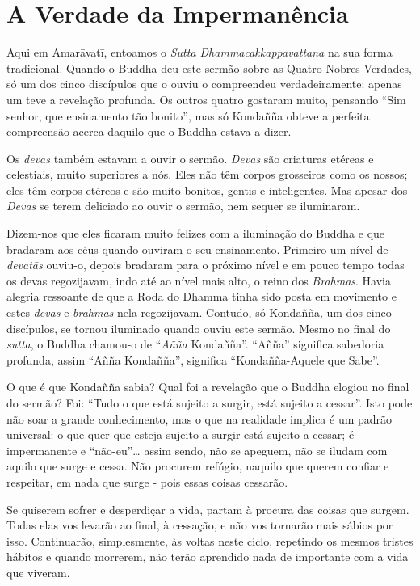 \section{A Verdade da Impermanência}

Aqui em Amarāvatī, entoamos o \emph{Sutta Dhammacakkappavattana} na sua forma
tradicional. Quando o Buddha deu este sermão sobre as Quatro Nobres Verdades, só
um dos cinco discípulos que o ouviu o compreendeu verdadeiramente: apenas um
teve a revelação profunda. Os outros quatro gostaram muito, pensando “Sim
senhor, que ensinamento tão bonito”, mas só Kondañña obteve a perfeita
compreensão acerca daquilo que o Buddha estava a dizer.

Os \emph{devas} também estavam a ouvir o sermão. \emph{Devas} são criaturas
etéreas e celestiais, muito superiores a nós. Eles não têm corpos grosseiros
como os nossos; eles têm corpos etéreos e são muito bonitos, gentis e
inteligentes. Mas apesar dos \emph{Devas} se terem deliciado ao ouvir o sermão,
nem sequer se iluminaram.

Dizem-nos que eles ficaram muito felizes com a iluminação do Buddha e que
bradaram aos céus quando ouviram o seu ensinamento. Primeiro um nível de
\emph{devatās} ouviu-o, depois bradaram para o próximo nível e em pouco tempo
todas os devas regozijavam, indo até ao nível mais alto, o reino dos
\emph{Brahmas}. Havia alegria ressoante de que a Roda do Dhamma tinha sido posta
em movimento e estes \emph{devas} e \emph{brahmas} nela regozijavam. Contudo, só
Kondañña, um dos cinco discípulos, se tornou iluminado quando ouviu este sermão.
Mesmo no final do \emph{sutta}, o Buddha chamou-o de “\emph{Añña} Kondañña”.
“Añña” significa sabedoria profunda, assim “Añña Kondañña”, significa
“Kondañña-Aquele que Sabe”.

O que é que Kondañña sabia? Qual foi a revelação que o Buddha elogiou no final
do sermão? Foi: “Tudo o que está sujeito a surgir, está sujeito a cessar”. Isto
pode não soar a grande conhecimento, mas o que na realidade implica é um padrão
universal: o que quer que esteja sujeito a surgir está sujeito a cessar; é
impermanente e “não-eu”\ldots{} assim sendo, não se apeguem, não se iludam com
aquilo que surge e cessa. Não procurem refúgio, naquilo que querem confiar e
respeitar, em nada que surge - pois essas coisas cessarão.

Se quiserem sofrer e desperdiçar a vida, partam à procura das coisas que surgem.
Todas elas vos levarão ao final, à cessação, e não vos tornarão mais sábios por
isso. Continuarão, simplesmente, às voltas neste ciclo, repetindo os mesmos
tristes hábitos e quando morrerem, não terão aprendido nada de importante com a
vida que viveram.

